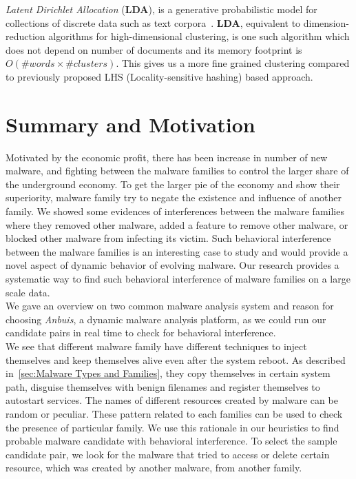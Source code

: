 \textit{Latent Dirichlet Allocation} (\textbf{LDA}), is a generative probabilistic model for collections of discrete data such as text corpora~\cite[LDA]{Blei}.
\textbf{LDA}, equivalent to dimension-reduction algorithms for high-dimensional clustering, is one such algorithm which does not depend on number of documents and its memory footprint is $O(\#words\times \#clusters)$.
This gives us a more fine grained clustering compared to previously proposed LHS (Locality-sensitive hashing) based approach.\\

\section{Summary and Motivation}
\label{sec:Motivation}
Motivated by the economic profit, there has been increase in number of new malware, and fighting between the malware families to control the larger share of the underground economy.
To get the larger pie of the economy and show their superiority, malware family try to negate the existence and influence of another family.
We showed some evidences of interferences between the malware families where they removed other malware, added a feature to remove other malware, or blocked other malware from infecting its victim.
Such behavioral interference between the malware families is an interesting case to study and would provide a novel aspect of dynamic behavior of evolving malware.
Our research provides a systematic way to find such behavioral interference of malware families on a large scale data.
\\
We gave an overview on two common malware analysis system and reason for choosing \emph{Anbuis}, a dynamic malware analysis platform, as we could run our candidate pairs in real time to check for behavioral interference.\\
We see that different malware family have different techniques to inject themselves and keep themselves alive even after the system reboot.
As described in~\autoref{sec:Malware Types and Families}, they copy themselves in certain system path, disguise themselves with benign filenames and register themselves to autostart services.
The names of different resources created by malware can be random or peculiar.
These pattern related to each families can be used to check the presence of particular family.
We use this rationale in our heuristics to find probable malware candidate with behavioral interference.
To select the sample candidate pair, we look for the malware that tried to access or delete certain resource, which was created by another malware, from another family.
